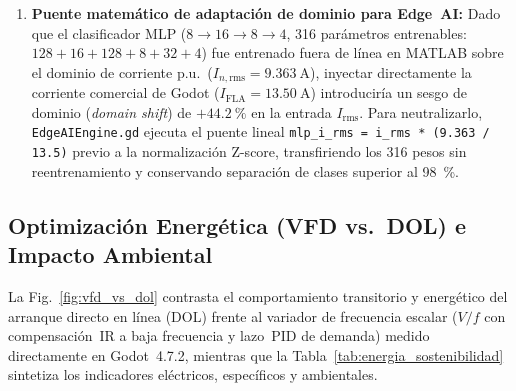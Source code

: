 \begin{enumerate}
\item \textbf{Puente matemático de adaptación de dominio para Edge~AI:} Dado que el clasificador MLP ($8\to 16\to 8\to 4$, \num{316} parámetros entrenables: $128+16+128+8+32+4$) fue entrenado fuera de línea en MATLAB sobre el dominio de corriente p.u.\ ($I_{n,\text{rms}}=\qty{9.363}{\ampere}$), inyectar directamente la corriente comercial de Godot ($I_{\text{FLA}}=\qty{13.50}{\ampere}$) introduciría un sesgo de dominio (\emph{domain shift}) de $+\qty{44.2}{\percent}$ en la entrada $I_{\text{rms}}$. Para neutralizarlo, \texttt{EdgeAIEngine.gd} ejecuta el puente lineal \texttt{mlp\_i\_rms = i\_rms * (9.363 / 13.5)} previo a la normalización Z-score, transfiriendo los \num{316} pesos sin reentrenamiento y conservando separación de clases superior al \qty{98}{\percent}.
\end{enumerate}

\subsection{Optimización Energética (VFD vs.\ DOL) e Impacto Ambiental}



La Fig.~\ref{fig:vfd_vs_dol} contrasta el comportamiento transitorio y energético del arranque directo en línea (DOL) frente al variador de frecuencia escalar ($V/f$ con compensación~IR a baja frecuencia y lazo~PID de demanda) medido directamente en Godot~4.7.2, mientras que la Tabla~\ref{tab:energia_sostenibilidad} sintetiza los indicadores eléctricos, específicos y ambientales.

